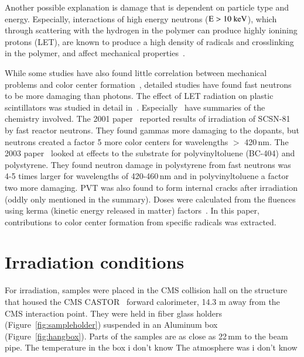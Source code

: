 \documentclass[review]{elsarticle}
\begin{document}
Another possible explanation is damage that is dependent on particle
type and energy.   Especially, interactions of high energy neutrons
(${\rm E>10~keV}$), which through scattering with the hydrogen in the
polymer can produce highly ionining protons (LET), are known to
produce a high density of radicals and crosslinking in the polymer,
and affect mechanical properties~\cite{lee199929}.

While some studies have also found little correlation between mechanical
problems and color center formation~\cite{clough1996583}, detailed studies
have found fast neutrons to be more damaging than photons.
The effect of LET radiation
on plastic scintillators was studied in detail
in~\cite{34504,467829,Bodmann2003495,Bodmann2001299}.
Especially~\cite{Bodmann2001299,Bodmann2003495} have 
summaries of the chemistry involved.
The 2001 paper~\cite{Bodmann2001299} reported results of irradiation of SCSN-81 by fast
reactor neutrons.
They found gammas more damaging to the dopants, but neutrons created a factor 5 more color centers for wavelengths $>$ 420\,nm.
The 2003 paper~\cite{Bodmann2003495} looked at effects to the substrate
for  polyvinyltoluene (BC-404) and polystyrene.
They found neutron damage in polystyrene from fast neutrons was 4-5
times larger for wavelengths of 420-460\,nm and in polyvinyltoluene
a factor two more damaging.
PVT was also found to form internal cracks after irradiation
(oddly only mentioned in the summary).
Doses were calculated from the fluences using
kerma (kinetic energy released in matter) factors~\cite{kerma}.
In this paper,
contributions to color center formation from specific radicals
was extracted.




\section{Irradiation conditions}
\label{sec:radiation}

For irradiation,
samples were placed in the CMS collision hall
on the structure that housed the CMS CASTOR~\cite{castor}
forward calorimeter, 14.3 m away from the CMS interaction point.
They were held in fiber glass holders (Figure~\ref{fig:sampleholder})
suspended in an Aluminum box (Figure~\ref{fig:hangbox}).
Parts of the samples are as close as 22\,mm
to the beam pipe.
The temperature in the box {\color{red} i don't know}
The atmosphere was  {\color{red} i don't know}
\end{document}
